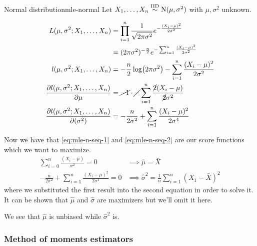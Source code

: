 \documentclass[12pt]{extarticle}
\newcommand{\Normal}{{\operatorfont N}}
\begin{document}
\begin{example}{Normal distribution}{mle-normal}
    Let $X_1, \dots, X_n \stackrel{\text{IID}}{\sim} \Normal(\mu,\sigma^2)$ with $\mu,\sigma^2$ unknown.

    \begin{align}
        L(\mu,\sigma^2; X_1, \dots, X_n)                   & = \prod_{i = 1}^n \frac{1}{\sqrt{2 \pi \sigma^2}} e^{-\frac{(X_i - \mu)^2}{2 \sigma^2}}                                 \\
                                                           & = (2 \pi \sigma^2)^{-\frac{n}{2}} e^{- \sum_{i = 1}^n \frac{(X_i - \mu)^2}{2 \sigma^2}}                                 \\
        l(\mu,\sigma^2; X_1, \dots, X_n)                   & = -\frac{n}{2}\log(2 \pi \sigma^2) - \sum_{i = 1}^n \frac{(X_i - \mu)^2}{2 \sigma^2}                                    \\
        \pdv{l(\mu,\sigma^2; X_1, \dots, X_n)}{\mu}        & = \cancel{-1 }\cdot \cancel{-} \sum_{i = 1}^n \frac{\cancel{2}(X_i - \mu)}{\cancel{2} \sigma^2}  \label{eq:mle-n-seq-1} \\
        \pdv{l(\mu,\sigma^2; X_1, \dots, X_n)}{(\sigma^2)} & = -\frac{n}{2 \sigma^2} + \sum_{i = 1}^n \frac{(X_i - \mu)^2}{2 \sigma^4} \label{eq:mle-n-seq-2}
    \end{align}

    Now we have that \cref{eq:mle-n-seq-1} and \cref{eq:mle-n-seq-2} are our score functions which we want to maximize.
    \begin{align}
        \sum_{i = 0}^{n} \frac{(X_i - \hat \mu)}{\sigma^2} = 0                      & \implies \hat \mu = \bar X                                            \\
        -\frac{n}{2 \sigma^2} + \sum_{i = 1}^n \frac{(X_i - \mu)^2}{2 \sigma^4} = 0 & \implies \hat{\sigma}^2 = \frac{1}{n} \sum_{i = 1}^n (X_1 - \bar X)^2
    \end{align}
    where we substituted the first result into the second equation in order to solve it.
    It can be shown that $\hat \mu$ and $\hat \sigma$ are maximizers but we'll omit it here.

    We see that $\hat \mu$ is unbiased while $\hat \sigma ^2$ is.
\end{example}

\subsubsection{Method of moments estimators}
\end{document}
